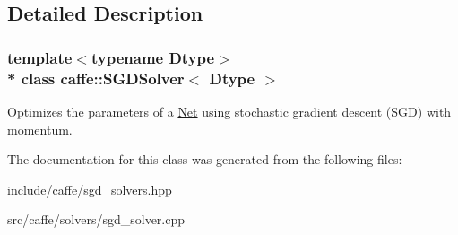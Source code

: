 \subsection{Detailed Description}
\subsubsection*{template$<$typename Dtype$>$\\*
class caffe\+::\+S\+G\+D\+Solver$<$ Dtype $>$}

Optimizes the parameters of a \hyperlink{classcaffe_1_1Net}{Net} using stochastic gradient descent (S\+GD) with momentum. 

The documentation for this class was generated from the following files\+:\begin{DoxyCompactItemize}
\item 
include/caffe/sgd\+\_\+solvers.\+hpp\item 
src/caffe/solvers/sgd\+\_\+solver.\+cpp\end{DoxyCompactItemize}
